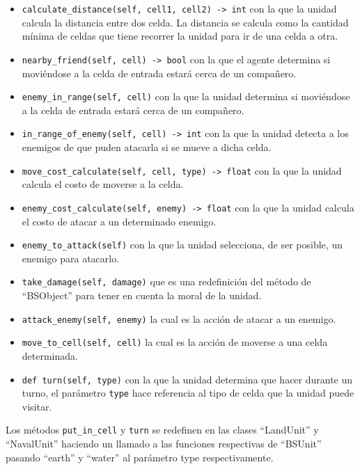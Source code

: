 \begin{itemize}
	\item \verb|calculate_distance(self, cell1, cell2) -> int| con la que la unidad calcula la distancia entre dos celda. La distancia se calcula como la cantidad mínima de celdas que tiene recorrer la unidad para ir de una celda a otra.
	\item \verb|nearby_friend(self, cell) -> bool| con la que el agente determina si moviéndose a la celda de entrada estará cerca de un compañero.
	\item \verb|enemy_in_range(self, cell)| con la que la unidad determina si moviéndose a la celda de entrada estará cerca de un compañero.
	\item \verb|in_range_of_enemy(self, cell) -> int| con la que la unidad detecta a los enemigos de que puden atacarla si se mueve a dicha celda.
	\item \verb|move_cost_calculate(self, cell, type) -> float| con la que la unidad calcula el costo de moverse a la celda.
	\item\verb|enemy_cost_calculate(self, enemy) -> float| con la que la unidad calcula el costo de atacar a un determinado enemigo.
	\item \verb|enemy_to_attack(self)| con la que la unidad selecciona, de ser posible, un enemigo para atacarlo.
	\item \verb|take_damage(self, damage)| que es una redefinición del método de ``BSObject'' para tener en cuenta la moral de la unidad.
	\item \verb|attack_enemy(self, enemy)| la cual es la acción de atacar a un enemigo.
	\item \verb|move_to_cell(self, cell)| la cual es la acción de moverse a una celda determinada.
	\item \verb|def turn(self, type)| con la que la unidad determina que hacer durante un turno, el parámetro \verb|type| hace referencia al tipo de celda que la unidad puede visitar.
\end{itemize}

Los métodos \verb|put_in_cell| y \verb|turn| se redefinen en las clases ``LandUnit'' y ``NavalUnit'' haciendo un llamado a las funciones respectivas de ``BSUnit'' pasando ``earth'' y ``water'' al parámetro type respectivamente.

